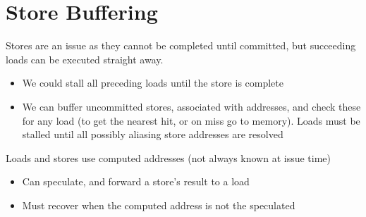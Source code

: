 \section{Store Buffering}
Stores are an issue as they cannot be completed until committed, but succeeding loads can be executed straight away.
\begin{itemize}
    \item We could stall all preceding loads until the store is complete
    \item We can buffer uncommitted stores, associated with addresses, and check these for any load (to get the nearest hit, or on miss go to memory). Loads must be stalled until all possibly aliasing store addresses are resolved
\end{itemize}
Loads and stores use computed addresses (not always known at issue time)
\begin{itemize}
    \item Can speculate, and forward a store's result to a load
    \item Must recover when the computed address is not the speculated
\end{itemize}

\unfinished

